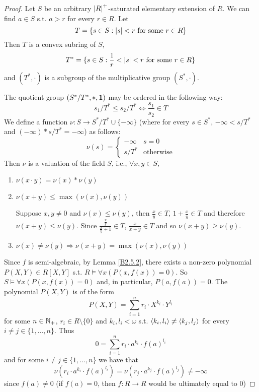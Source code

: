 \documentclass[11pt]{article}
\begin{document}
\begin{proof}
Let \(S\) be an arbitrary \(\abs{R}^+\)-saturated elementary extension of \(R\). We can
find \(a\in S\) s.t. \(a>r\) for every \(r\in R\). Let
\begin{equation*}
T=\{s\in S:\abs{s}<r\text{ for some }r\in R\}
\end{equation*}
Then \(T\) is a convex subring of \(S\),
\begin{equation*}
T^*=\{s\in S:\frac{1}{r}<\abs{s}<r\text{ for some }r\in R\}
\end{equation*}
and \((T^*,\cdot)\) is a subgroup of the multiplicative group \((S^*,\cdot)\).

The quotient group \((S^*/T^*,*,\operatorname{\textbf{1}})\) may be ordered in the following way:
\begin{equation*}
s_1/T^*\le s_2/T^*\Leftrightarrow\frac{s_1}{s_2}\in T
\end{equation*}
We define a function \(\nu:S\to S^*/T^*\cup\{-\infty\}\) (where for every \(s\in S^*\), \(-\infty<s/T^*\)
and \((-\infty)* s/T^*=-\infty\)) as follows:
\begin{equation*}
\nu(s)=
\begin{cases}
-\infty&s=0\\
s/T^*&\text{otherwise}
\end{cases}
\end{equation*}
Then \(\nu\) is a valuation of the field \(S\), i.e., \(\forall x,y\in S\),
\begin{enumerate}
\setcounter{enumi}{0}
\item \(\nu(x\cdot y)=\nu(x)*\nu(y)\)
\item \(\nu(x+y)\le\max(\nu(x),\nu(y))\)

Suppose \(x,y\neq 0\) and \(\nu(x)\le\nu(y)\), then \(\frac{x}{y}\in T\), \(1+\frac{x}{y}\in T\) and
therefore \(\nu(x+y)\le\nu(y)\).
Since \(\frac{\frac{x}{y}}{\frac{x}{y}+1}\in T\), \(\frac{x}{x+y}\in T\) and so \(\nu(x+y)\ge\nu(y)\).
\item \(\nu(x)\neq\nu(y)\Rightarrow\nu(x+y)=\max(\nu(x),\nu(y))\)
\end{enumerate}


Since \(f\) is semi-algebraic, by Lemma \ref{B2.5.2}, there exists a
non-zero polynomial \(P(X,Y)\in R[X,Y]\) s.t. \(R\vDash\forall x(P(x,f(x))=0)\). So \(S\vDash\forall x(P(x,f(x))=0)\)
and, in particular, \(P(a,f(a))=0\). The polynomial \(P(X,Y)\) is of the form
\begin{equation*}
P(X,Y)=\sum_{i=1}^nr_i\cdot X^{k_i}\cdot Y^{l_i}
\end{equation*}
for some \(n\in\mathbb{N}_+\), \(r_i\in R\setminus\{0\}\) and \(k_i,l_i<\omega\) s.t. \(\langle k_i,l_i\rangle\neq\langle k_j,l_j\rangle\) for
every \(i\neq j\in\{1,\dots,n\}\). Thus
\begin{equation*}
0=\sum_{i=1}^nr_i\cdot a^{k_i}\cdot f(a)^{l_i}
\end{equation*}
and for some \(i\neq j\in\{1,\dots,n\}\) we have that
\begin{equation*}
\nu(r_i\cdot a^{k_i}\cdot f(a)^{l_i})=\nu(r_j\cdot a^{k_j}\cdot f(a)^{l_j})\neq-\infty
\end{equation*}
since \(f(a)\neq 0\) (if \(f(a)=0\), then \(f:R\to R\) would be ultimately equal to 0)


\end{proof}
\end{document}
